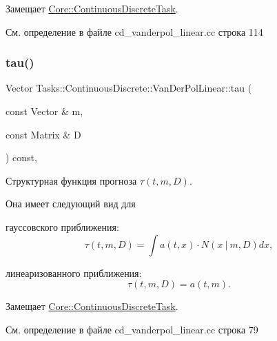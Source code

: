 Замещает \hyperlink{class_core_1_1_continuous_discrete_task_a25e88b71eb477d99bad66a66c982af6f}{Core\+::\+Continuous\+Discrete\+Task}.



См. определение в файле cd\+\_\+vanderpol\+\_\+linear.\+cc строка 114

\hypertarget{class_tasks_1_1_continuous_discrete_1_1_van_der_pol_linear_a5b9245d9f403e615a971f2e8009926e6}{}\label{class_tasks_1_1_continuous_discrete_1_1_van_der_pol_linear_a5b9245d9f403e615a971f2e8009926e6} 
\subsubsection{\texorpdfstring{tau()}{tau()}}
{\footnotesize\ttfamily Vector Tasks\+::\+Continuous\+Discrete\+::\+Van\+Der\+Pol\+Linear\+::tau (\begin{DoxyParamCaption}\item[{const Vector \&}]{m,  }\item[{const Matrix \&}]{D }\end{DoxyParamCaption}) const\hspace{0.3cm}{\ttfamily [override]}, {\ttfamily [virtual]}}



Структурная функция прогноза $\tau(t, m, D)$. 

Она имеет следующий вид для


\begin{DoxyItemize}
\item гауссовского приближения\+: \[\tau(t, m, D) = \int a(t,x)\cdot N(x\ |\ m, D)dx,\]
\item линеаризованного приближения\+: \[\tau(t, m, D) = a(t, m).\] 
\end{DoxyItemize}

Замещает \hyperlink{class_core_1_1_continuous_discrete_task_a491a9dc4463031a6f5f2eeda24d8ba9c}{Core\+::\+Continuous\+Discrete\+Task}.



См. определение в файле cd\+\_\+vanderpol\+\_\+linear.\+cc строка 79

\hypertarget{class_tasks_1_1_continuous_discrete_1_1_van_der_pol_linear_a6d2f1c4c12551eda7eb97322335960ef}{}\label{class_tasks_1_1_continuous_discrete_1_1_van_der_pol_linear_a6d2f1c4c12551eda7eb97322335960ef} 
